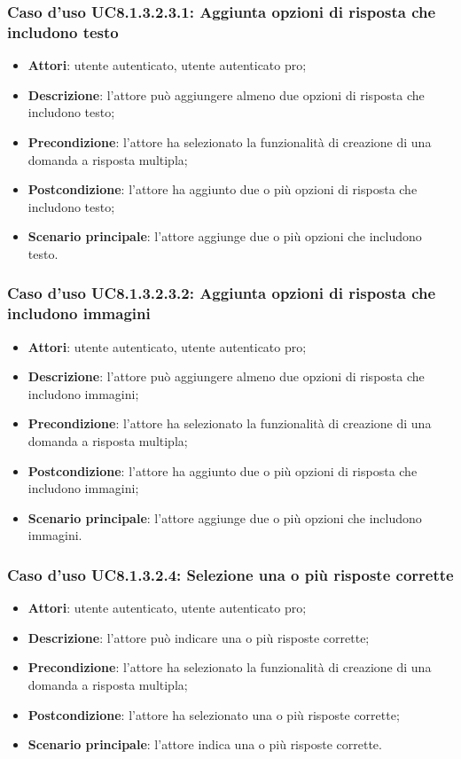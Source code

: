 \subsubsection{Caso d'uso UC8.1.3.2.3.1: Aggiunta opzioni di risposta che includono testo}
	\begin{itemize}
		\item
			\textbf{Attori}: utente autenticato, utente autenticato pro;
		\item		
			\textbf{Descrizione}: l'attore può aggiungere almeno due opzioni di risposta che includono testo;
		\item
			\textbf{Precondizione}: l'attore ha selezionato la funzionalità di creazione di una domanda a risposta multipla;
		\item
			\textbf{Postcondizione}: l'attore ha aggiunto due o più opzioni di risposta che includono testo;
		\item
			\textbf{Scenario principale}: l'attore aggiunge due o più opzioni che includono testo.				
	\end{itemize}	

\subsubsection{Caso d'uso UC8.1.3.2.3.2: Aggiunta opzioni di risposta che includono immagini}
	\begin{itemize}
		\item
			\textbf{Attori}: utente autenticato, utente autenticato pro;
		\item		
			\textbf{Descrizione}: l'attore può aggiungere almeno due opzioni di risposta che includono immagini;
		\item
			\textbf{Precondizione}: l'attore ha selezionato la funzionalità di creazione di una domanda a risposta multipla;
		\item
			\textbf{Postcondizione}: l'attore ha aggiunto due o più opzioni di risposta che includono immagini;
		\item
			\textbf{Scenario principale}: l'attore aggiunge due o più opzioni che includono immagini. 				
	\end{itemize}	
		
\subsubsection{Caso d'uso UC8.1.3.2.4: Selezione una o più risposte corrette}
	\begin{itemize}
		\item
			\textbf{Attori}: utente autenticato, utente autenticato pro;
		\item		
			\textbf{Descrizione}: l'attore può indicare una o più risposte corrette;
		\item
			\textbf{Precondizione}: l'attore ha selezionato la funzionalità di creazione di una domanda a risposta multipla;
		\item
			\textbf{Postcondizione}: l'attore ha selezionato una o più risposte corrette;
		\item
			\textbf{Scenario principale}: l'attore indica una o più risposte corrette. 			
	\end{itemize}
